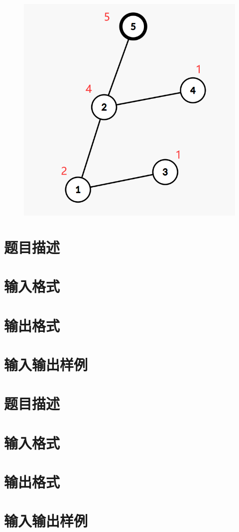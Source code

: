 \documentclass{ctpro}
\begin{document}
\begin{figure}
	\includegraphics[scale=0.14]{images/D_5.png}
\end{figure}

\makeproblem
\section*{题目描述}
\section*{输入格式}
\section*{输出格式}
\section*{输入输出样例}

\makeproblem
\section*{题目描述}
\section*{输入格式}
\section*{输出格式}
\section*{输入输出样例}
\end{document}

